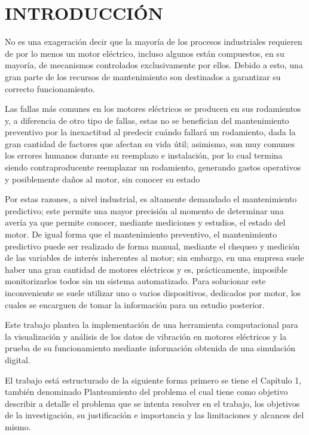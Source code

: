 \thispagestyle{empty}
\section*{INTRODUCCIÓN}

No es una exageración decir que la mayoría de los procesos industriales
requieren de por lo menos un motor eléctrico, incluso algunos están compuestos, en su
mayoría, de mecanismos controlados exclusivamente por ellos. Debido a esto,
una gran parte de los recursos de mantenimiento son destinados a garantizar
su correcto funcionamiento.

Las fallas más comunes en los motores eléctricos se producen en sus rodamientos
y, a diferencia de otro tipo de fallas, estas no se benefician
del mantenimiento preventivo por la inexactitud al predecir cuándo
fallará un rodamiento, dada la gran cantidad de factores que afectan su vida útil;
asimismo, son muy comunes los errores humanos durante su reemplazo e instalación,
por lo cual termina siendo contraproducente reemplazar un rodamiento,
generando gastos operativos y posiblemente daños al motor,
sin conocer su estado

Por estas razones, a nivel industrial, es altamente demandado el mantenimiento
predictivo; este permite una mayor precisión al momento de determinar una avería
ya que permite conocer, mediante mediciones y estudios, el estado del motor.
De igual forma que el mantenimiento preventivo, el mantenimiento predictivo puede
ser realizado de forma manual, mediante el chequeo y medición de las variables de
interés inherentes al motor; sin embargo, en una empresa suele haber una gran cantidad
de motores eléctricos y es, prácticamente, imposible monitorizarlos todos sin un sistema
automatizado. Para solucionar este inconveniente se suele utilizar
uno o varios dispositivos, dedicados por motor, los cuales se encarguen de tomar
la información para un estudio posterior.

Este trabajo plantea la implementación de una herramienta computacional para la
visualización y análisis de los datos de vibración en motores eléctricos y la
prueba de su funcionamiento mediante información obtenida de una
simulación digital.

El trabajo está estructurado de la siguiente forma primero se tiene el Capítulo
1, también denominado Planteamiento del problema el cual tiene como objetivo
describir a detalle el problema que se intenta resolver en el trabajo, los
objetivos de la investigación, su justificación e importancia y las
limitaciones y alcances del mismo.

